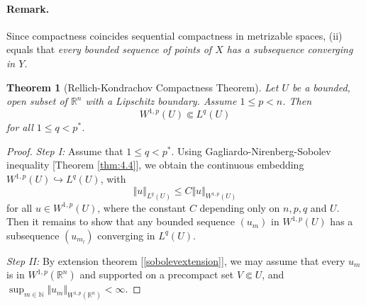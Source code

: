 \documentclass{article}
\numberwithin{equation}{section}
\newcommand{\bbN}{\mathbb{N}}
\newcommand{\bbR}{\mathbb{R}}
\theoremstyle{plain}
\newtheorem{theorem}{Theorem}[section]
\theoremstyle{definition}
\begin{document}
\paragraph{Remark.} Since compactness coincides sequential compactness in metrizable spaces, (ii) equals that \textit{every bounded sequence of points of $X$ has a subsequence converging in $Y$.}

\begin{theorem}[Rellich-Kondrachov Compactness Theorem]\label{RKCT}
Let $U$ be a bounded, open subset of $\bbR^n$ with a Lipschitz boundary. Assume $1\leq p <n$. Then $$W^{1,p}(U)\Subset L^q(U)$$ for all $1\leq q< p^*$.
\end{theorem}
\begin{proof}
\textit{Step I:} Assume that $1\leq q<p^*$. Using Gagliardo-Nirenberg-Sobolev inequality [Theorem \ref{thm:4.4}], we obtain the continuous embedding $W^{1,p}(U)\hookrightarrow L^q(U)$, with $$\Vert u\Vert_{L^q(U)}\leq C\Vert u\Vert_{W^{1,p}(U)}$$ for all $u\in W^{1,p}(U)$, where the constant $C$ depending only on $n,p,q$ and $U$. Then it remains to show that any bounded sequence $(u_m)$ in $W^{1,p}(U)$ has a subsequence $(u_{m_l})$ converging in $L^q(U)$.\vspace{0.15cm}

\textit{Step II:} By extension theorem [\ref{sobolevextension}], we may assume that every $u_m$ is in $W^{1,p}(\bbR^n)$ and supported on a precompact set $V\Subset U$, and $\sup_{m\in\bbN}\Vert u_m\Vert_{W^{1,p}(\bbR^n)}<\infty$. 


\end{proof}
\end{document}
